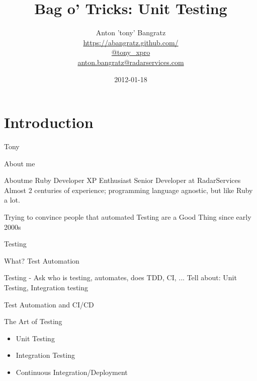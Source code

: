 \documentclass[style=paintings,palette=Charon,display=slides,clock]{powerdot}
\title{Bag o' Tricks: Unit Testing}
\author{Anton 'tony' Bangratz\\
	\url{https://abangratz.github.com/}\\
	\url{@tony_xpro}\\
\url{anton.bangratz@radarservices.com}}
\date{2012-01-18}
\begin{document}
\maketitle
\section{Introduction}
\begin{slide}{Tony}
	\begin{center}
		\Huge About me
	\end{center}
\end{slide}
\begin{note}{Aboutme}
			Ruby Developer
			XP Enthusiast
			Senior Developer at RadarServices
	Almost 2 centuries of experience; programming language agnostic, but like Ruby a lot. 

	Trying to convince people that automated Testing are a Good Thing since early 2000s
\end{note}
\begin{slide}{Testing}
	\begin{center}
		 {\Huge What?}
		 {\Huge Test Automation}
	\end{center}
\end{slide}
\begin{note}{Testing}
	- Ask who is testing, automates, does TDD, CI, ...
	Tell about: Unit Testing, Integration testing

	Test Automation and CI/CD
\end{note}
\begin{slide}{The Art of Testing}
	\begin{itemize}[type=1]
		\item Unit Testing\pause
		\item Integration Testing\pause
		\item Continuous Integration/Deployment
	\end{itemize}
\end{slide}
\end{document}
